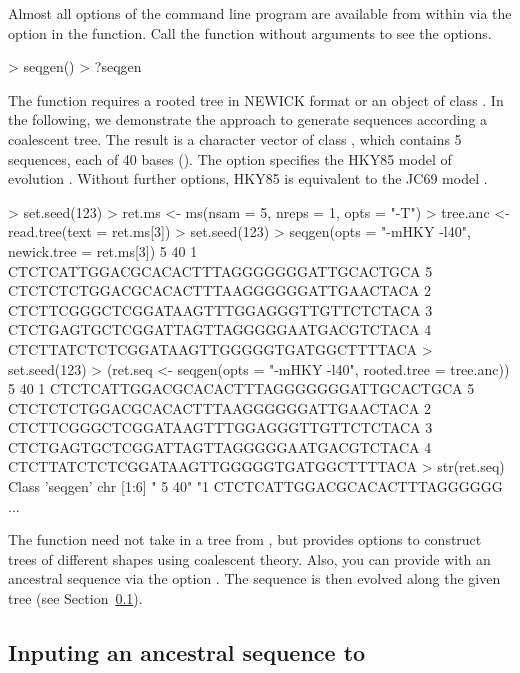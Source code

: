 Almost all options of the command line program  are available from within  via
the option  in the  function.
Call the function without arguments to see the options.
\begin{Code}
> seqgen()
> ?seqgen
\end{Code}

The  function requires a rooted tree in NEWICK format or an object of class .
In the following, we demonstrate the  approach
to generate sequences according a coalescent tree. The result is a character
vector of class {\color{red} }, which contains 5 sequences, 
each of 40 bases (). The option  specifies the HKY85
model of evolution \citep{Hasegawa1985}.
Without further options, HKY85 is equivalent to the JC69 model \citep{Jukes1969}.
\begin{Code}
> set.seed(123)
> ret.ms <- ms(nsam = 5, nreps = 1, opts = "-T")
> tree.anc <- read.tree(text = ret.ms[3])
> set.seed(123)
> seqgen(opts = "-mHKY -l40", newick.tree = ret.ms[3])
 5 40
1         CTCTCATTGGACGCACACTTTAGGGGGGGATTGCACTGCA
5         CTCTCTCTGGACGCACACTTTAAGGGGGGATTGAACTACA
2         CTCTTCGGGCTCGGATAAGTTTGGAGGGTTGTTCTCTACA
3         CTCTGAGTGCTCGGATTAGTTAGGGGGAATGACGTCTACA
4         CTCTTATCTCTCGGATAAGTTGGGGGTGATGGCTTTTACA
> set.seed(123)
> (ret.seq <- seqgen(opts = "-mHKY -l40", rooted.tree = tree.anc))
 5 40
1         CTCTCATTGGACGCACACTTTAGGGGGGGATTGCACTGCA
5         CTCTCTCTGGACGCACACTTTAAGGGGGGATTGAACTACA
2         CTCTTCGGGCTCGGATAAGTTTGGAGGGTTGTTCTCTACA
3         CTCTGAGTGCTCGGATTAGTTAGGGGGAATGACGTCTACA
4         CTCTTATCTCTCGGATAAGTTGGGGGTGATGGCTTTTACA
> str(ret.seq)
Class 'seqgen'  chr [1:6] " 5 40" "1         CTCTCATTGGACGCACACTTTAGGGGGG ...
\end{Code}

The  function need not take in a tree from ,
but  provides options to construct trees of
different shapes using coalescent theory.
Also, you can provide  with an ancestral sequence via the option .
The sequence is then evolved along the given tree (see Section~\ref{sec:ancestral}).




\subsection[Inputing an ancestral sequence to ms+seqgen]{Inputing an ancestral sequence to }
\label{sec:ancestral}

